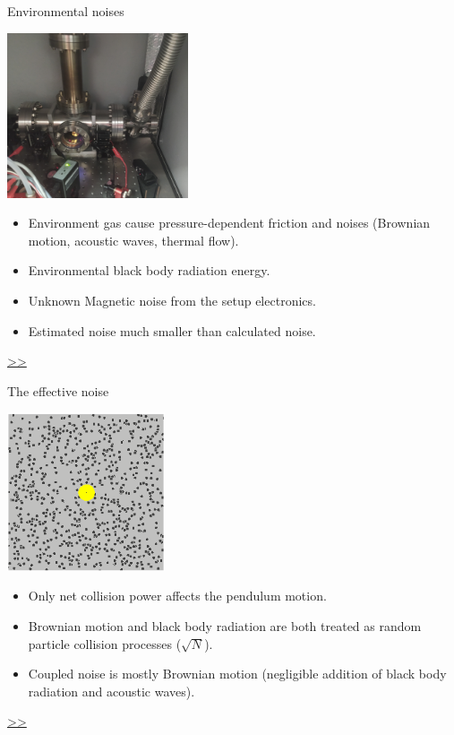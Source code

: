 \documentclass{beamer}
\begin{document}
\begin{frame}{\hypertarget{frame:Environmental noises}{Environmental noises}}
	\begin{center}		
		\includegraphics[width=0.4\textwidth,keepaspectratio]{actual system_crop.jpg}
    \end{center}
	\begin{itemize}
		
		\item Environment gas cause pressure-dependent friction and noises (Brownian motion, acoustic waves, thermal flow).  
		\item Environmental black body radiation energy.
		\item Unknown Magnetic noise from the setup electronics.
		\item Estimated noise much smaller than calculated noise.				

			
	\end{itemize}
	\hyperlink{frame:Environmental noises 1}{>>} 
\end{frame}




\begin{frame}{\hypertarget{frame:The effective noise}{The effective noise}}
	\begin{center}		
		\includegraphics[width=0.35\textwidth,keepaspectratio]{random_motion1.jpg}
	\end{center}


	\begin{itemize}	
		
		\item Only net collision power affects the pendulum motion.
		\item Brownian motion and black body radiation are both treated as random particle collision processes ($\sqrt{N}$).
		\item Coupled noise is mostly Brownian motion (negligible addition of black body radiation and acoustic waves).   	 
					
	\end{itemize}
	\hyperlink{frame:The effective noise 1}{>>} 

\end{frame}
\end{document}
